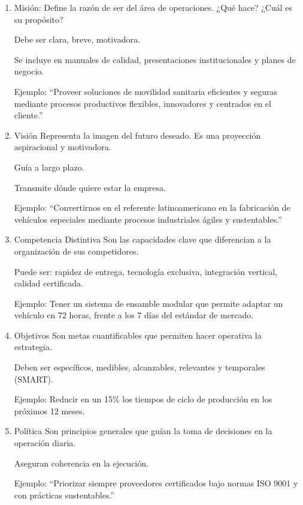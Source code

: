 \documentclass[a4paper,oneside,11pt]{article}
\begin{document}
\begin{enumerate}
    \item Misión:
    Define la razón de ser del área de operaciones. ¿Qué hace? ¿Cuál es su propósito?
    
    Debe ser clara, breve, motivadora.
    
    Se incluye en manuales de calidad, presentaciones institucionales y planes de negocio.
    
    Ejemplo:
    “Proveer soluciones de movilidad sanitaria eficientes y seguras mediante procesos productivos flexibles, innovadores y centrados en el cliente.”

    \item Visión
    Representa la imagen del futuro deseado. Es una proyección aspiracional y motivadora.
    
    Guía a largo plazo.
    
    Transmite dónde quiere estar la empresa.
    
    Ejemplo:
    “Convertirnos en el referente latinoamericano en la fabricación de vehículos especiales mediante procesos industriales ágiles y sustentables.”

    \item Competencia Distintiva
    Son las capacidades clave que diferencian a la organización de sus competidores.
    
    Puede ser: rapidez de entrega, tecnología exclusiva, integración vertical, calidad certificada.
    
    Ejemplo:
    Tener un sistema de ensamble modular que permite adaptar un vehículo en 72 horas, frente a los 7 días del estándar de mercado.

    \item Objetivos
    Son metas cuantificables que permiten hacer operativa la estrategia.
    
    Deben ser específicos, medibles, alcanzables, relevantes y temporales (SMART).
    
    Ejemplo:
    Reducir en un 15\% los tiempos de ciclo de producción en los próximos 12 meses.

    \item Política
    Son principios generales que guían la toma de decisiones en la operación diaria.
    
    Aseguran coherencia en la ejecución.
    
    Ejemplo:
    “Priorizar siempre proveedores certificados bajo normas ISO 9001 y con prácticas sustentables.”
    
\end{enumerate}
\end{document}
